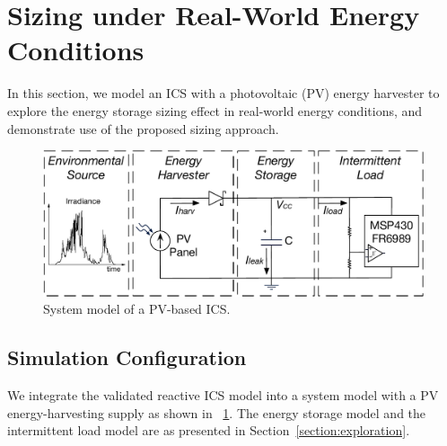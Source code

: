 
\section{Sizing under Real-World Energy Conditions} \label{section:demo}

In this section, we model an ICS with a photovoltaic (PV) energy harvester to explore the energy storage sizing effect in real-world energy conditions, and demonstrate use of the proposed sizing approach. 

\begin{figure}[!t]
    \centering
    \includegraphics[width=0.8\columnwidth]{ch4_sizingapproach/figures/solarmodel4}
    \caption{System model of a PV-based ICS.}
    \label{fig:Model}
\end{figure}

\subsection{Simulation Configuration}

We integrate the validated reactive ICS model into a system model with a PV energy-harvesting supply as shown in \figurename{~\ref{fig:Model}}. 
The energy storage model and the intermittent load model are as presented in Section~\ref{section:exploration}. 

